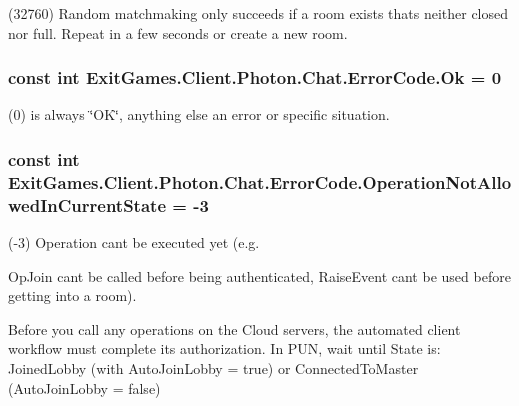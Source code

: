 (32760) Random matchmaking only succeeds if a room exists thats neither closed nor full. Repeat in a few seconds or create a new room.

\subsubsection[{\texorpdfstring{Ok}{Ok}}]{\setlength{\rightskip}{0pt plus 5cm}const int Exit\+Games.\+Client.\+Photon.\+Chat.\+Error\+Code.\+Ok = 0}\hypertarget{class_exit_games_1_1_client_1_1_photon_1_1_chat_1_1_error_code_a432f4d428147b0455487dc2b28474e86}{}\label{class_exit_games_1_1_client_1_1_photon_1_1_chat_1_1_error_code_a432f4d428147b0455487dc2b28474e86}


(0) is always \char`\"{}\+O\+K\char`\"{}, anything else an error or specific situation.

\subsubsection[{\texorpdfstring{Operation\+Not\+Allowed\+In\+Current\+State}{OperationNotAllowedInCurrentState}}]{\setlength{\rightskip}{0pt plus 5cm}const int Exit\+Games.\+Client.\+Photon.\+Chat.\+Error\+Code.\+Operation\+Not\+Allowed\+In\+Current\+State = -\/3}\hypertarget{class_exit_games_1_1_client_1_1_photon_1_1_chat_1_1_error_code_abe840b6d5d214a382cc3126010610e61}{}\label{class_exit_games_1_1_client_1_1_photon_1_1_chat_1_1_error_code_abe840b6d5d214a382cc3126010610e61}


(-\/3) Operation can\textquotesingle{}t be executed yet (e.\+g. 

Op\+Join can\textquotesingle{}t be called before being authenticated, Raise\+Event cant be used before getting into a room). 

Before you call any operations on the Cloud servers, the automated client workflow must complete its authorization. In P\+UN, wait until State is\+: Joined\+Lobby (with Auto\+Join\+Lobby = true) or Connected\+To\+Master (Auto\+Join\+Lobby = false) 
